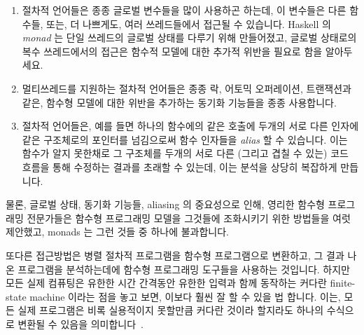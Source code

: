 \begin{enumerate}
\item	절차적 언어들은 종종 글로벌 변수들을 많이 사용하곤 하는데, 이 변수들은
	다른 함수들, 또는, 더 나쁘게도, 여러 쓰레드들에서 접근될 수 있습니다.
	Haskell 의 \emph{monad} 는 단일 쓰레드의 글로벌 상태를 다루기 위해
	만들어졌고, 글로벌 상태로의 복수 쓰레드에서의 접근은 함수적
	모델에 대한 추가적 위반을 필요로 함을 알아두세요.
\item	멀티쓰레드를 지원하는 절차적 언어들은 종종 락, 어토믹 오퍼레이션,
	트랜잭션과 같은, 함수형 모델에 대한 위반을 추가하는 동기화 기능들을
	종종 사용합니다.
\item	절차적 언어들은, 예를 들면 하나의 함수에의 같은 호출에 두개의 서로 다른
	인자에 같은 구조체로의 포인터를 넘김으로써 함수 인자들을 \emph{alias}
	할 수 있습니다.
	이는 함수가 알지 못한채로 그 구조체를 두개의 서로 다른 (그리고 겹칠 수
	있는) 코드 흐름을 통해 수정하는 결과를 초래할 수 있는데, 이는 분석을
	상당히 복잡하게 만듭니다.
\iffalse

\item	Procedural languages often make heavy use of global variables,
	which can be updated independently by different
	functions, or, worse yet, by multiple threads.
	Note that Haskell's \emph{monads} were invented to deal with
	single-threaded global state, and that multi-threaded access to
	global state requires additional violence to the functional model.
\item	Multithreaded procedural languages often use synchronization
	primitives such as locks, atomic operations, and transactions,
	which inflict added violence upon the functional model.
\item	Procedural languages can \emph{alias} function arguments,
	for example, by passing a pointer to the same structure via two
	different arguments to the same invocation of a given function.
	This can result in the function unknowingly updating that
	structure via two different (and possibly overlapping) code
	sequences, which greatly complicates analysis.
\fi
\end{enumerate}

물론, 글로벌 상태, 동기화 기능들, aliasing 의 중요성으로 인해, 영리한 함수형
프로그래밍 전문가들은 함수형 프로그래밍 모델을 그것들에 조화시키기 위한
방법들을 여럿 제안했고, monads 는 그런 것들 중 하나에 불과합니다.

또다른 접근방법은 병렬 절차적 프로그램을 함수형 프로그램으로 변환하고, 그 결과
나온 프로그램을 분석하는데에 함수형 프로그래밍 도구들을 사용하는 것입니다.
하지만 모든 실제 컴퓨팅은 유한한 시간 간격동안 유한한 입력과 함께 동작하는
커다란 finite-state machine 이라는 점을 놓고 보면, 이보다 훨씬 잘 할 수 있을 법
합니다.
이는, 모든 실제 프로그램은 비록 실용적이지 못할만큼 커다란 것이라 할지라도
하나의 수식으로 변환될 수 있음을 의미합니다~\cite{VijayDSilva2012-sas}.
\iffalse

